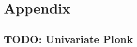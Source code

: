 \documentclass[11pt]{article}
\theoremstyle{definition}
\theoremstyle{remark}
\begin{document}





\appendix
\section{Appendix}
\label{s:Appendix}

\subsection{TODO: Univariate Plonk}



\end{document}
